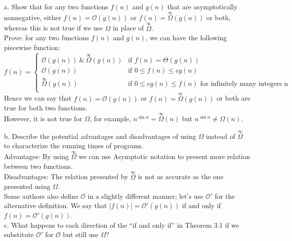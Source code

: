 \documentclass[12pt,letterpaper]{article}
\begin{document}
\begin{enumerate}
a. Show that for any two functions $f(n)$ and $g(n)$ that are asymptotically nonnegative, either $f(n)=\mathcal{O}(g(n))$ or $f(n)=\stackrel{ \infty} \Omega (g(n))$ or both, whereas this is not true if we use $\Omega$ in place of $\stackrel{ \infty} \Omega $.\\

Prove: for any two functions $f(n)$ and $g(n)$, we can have the following piecewise function:\\
\begin{equation}
   f(n)=
   \begin{cases}
   \mathcal{O}(g(n)) \ \& \  \stackrel{ \infty} \Omega (g(n)) &\mbox{if $f(n)=\Theta(g(n))$}\\
   \mathcal{O}(g(n)) &\mbox{if $0 \le f(n) \le c g(n)$}\\
   \stackrel{ \infty} \Omega (g(n)) &\mbox{if $0 \le c g(n) \le f(n)$ for infinitely many integers n}\\
   \end{cases}
  \end{equation}
Hence we can say that $f(n)=\mathcal{O}(g(n))$ or $f(n)=\stackrel{ \infty} \Omega (g(n))$ or both are true for both two functions.\\

However, it is not true for $\Omega$, for example, $n^{\sin n} = \stackrel{\infty} {\Omega} (n)$ but $n^{\sin n} \neq \Omega (n)$.

b. Describe the potential advantages and disadvantages of using $\Omega$ instead of $\stackrel{ \infty } { \Omega }$ to characterize the running times of programs.\\

Advantages: By using $\stackrel{\infty} {\Omega}$ we can use Asymptotic notation to present more relation between two functions.\\

Disadvantages: The relation presented by $\stackrel{\infty} {\Omega}$ is not as accurate as the one presented using $\Omega$. \\

Some authors also define $\mathcal{O}$ in a slightly different manner; let’s use $\mathcal{O}'$ for the alternative definition. We say that $|f(n)| = \mathcal{O}' (g(n))$ if and only if $f(n) = \mathcal{O}' (g(n))$.\\

c. What happens to each direction of the “if and only if” in Theorem 3.1 if we substitute $\mathcal{O}'$ for $\mathcal{O}$ but still use $\Omega$? \\


\end{enumerate}
\end{document}

